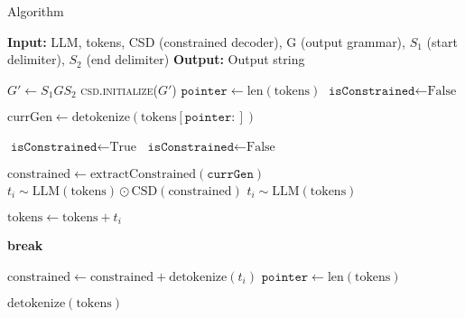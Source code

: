 \begin{algorithm}[t]
\caption{\Tool{} Algorithm}
\label{alg:crane}
\begin{algorithmic}[1]
\State \textbf{Input:} LLM, tokens, CSD (constrained decoder), G (output grammar), $S_1$ (start delimiter), $S_2$ (end delimiter)
\State \textbf{Output:} Output string

\State $G' \gets S_1 G S_2$
\State \textsc{csd.initialize}($G'$)
\State $\texttt{pointer} \gets \text{len}(\text{tokens})$
\State $\texttt{isConstrained} \gets \text{False}$

    \State $\text{currGen} \gets \text{detokenize}(\text{tokens}[\texttt{pointer}:])$
    
        \State $\texttt{isConstrained} \gets \text{True}$
    \Else
        \State $\texttt{isConstrained} \gets \text{False}$
    \EndIf
    
        \State $\text{constrained} \gets \text{extractConstrained}(\texttt{currGen})$
        \State $t_i \sim \text{LLM}(\text{tokens}) \odot \text{CSD}(\text{constrained})$
    \Else
        \State $t_i \sim \text{LLM}(\text{tokens})$
    \EndIf
    
    \State $\text{tokens} \gets \text{tokens} + t_i$
    
        \State \textbf{break}
    \EndIf
    
        \State $\text{constrained} \gets \text{constrained} + \text{detokenize}(t_i)$
            \State $\texttt{pointer} \gets \text{len}(\text{tokens})$
        \EndIf
    \EndIf
\EndWhile

\State \Return $\text{detokenize}(\text{tokens})$
\end{algorithmic}
\end{algorithm}